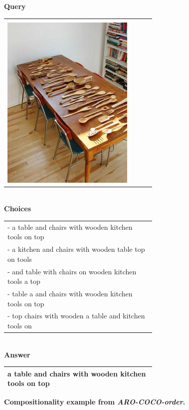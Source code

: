 \begin{figure}[h]
\centering
\textbf{Query}

\begin{tabular}{|p{0.7\linewidth}|}
\hline
\\
\includegraphics[width=\linewidth,frame]{figures/examples_assests/compositionality/image.pdf} \\
\hline
\end{tabular}
\\
\textbf{Choices}
\\
\begin{tabular}{|p{0.7\linewidth}|}
\hline
 - a table and chairs with wooden kitchen tools on top \\ 
 - a kitchen and chairs with wooden table top on tools\\
 - and table with chairs on wooden kitchen tools a top \\
 - table a and chairs with wooden kitchen tools on top \\
 - top chairs with wooden a table and kitchen tools on \\
 \hline
\end{tabular}
\\
\textbf{Answer} 
\\
\begin{tabular}{|p{0.7\linewidth}|}
\hline
a table and chairs with wooden kitchen tools on top \\
\hline
\end{tabular}
\caption{\textbf{Compositionality example from \emph{ARO-COCO-order}.}
\label{fig:compositionality_example}}
\end{figure}